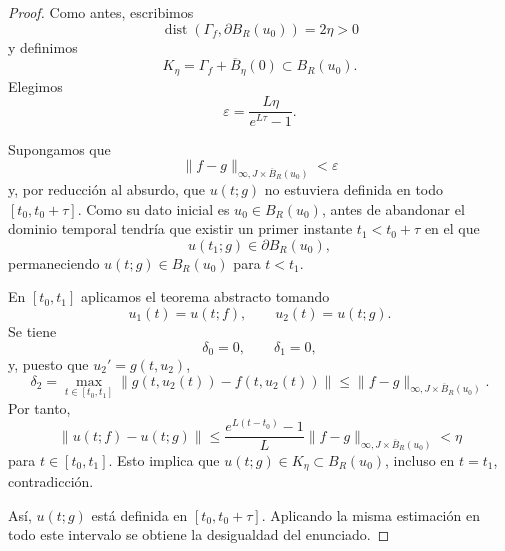 \begin{proof}
    Como antes, escribimos
    \[
        \operatorname{dist}(\Gamma_f,\partial B_R(u_0))=2\eta>0
    \]
    y definimos
    \[
        K_\eta=\Gamma_f+\overline{B}_\eta(0)\subset B_R(u_0).
    \]
    Elegimos
    \[
        \varepsilon=\frac{L\eta}{e^{L\tau}-1}.
    \]

    \begin{center}
    \end{center}

    Supongamos que
    \[
        \|f-g\|_{\infty,J\times\overline{B}_R(u_0)}<\varepsilon
    \]
    y, por reducción al absurdo, que $u(t;g)$ no estuviera definida en todo $[t_0,t_0+\tau]$. Como su dato inicial es $u_0\in B_R(u_0)$, antes de abandonar el dominio temporal tendría que existir un primer instante $t_1<t_0+\tau$ en el que
    \[
        u(t_1;g)\in\partial B_R(u_0),
    \]
    permaneciendo $u(t;g)\in B_R(u_0)$ para $t<t_1$.

    En $[t_0,t_1]$ aplicamos el teorema abstracto tomando
    \[
        u_1(t)=u(t;f),\qquad u_2(t)=u(t;g).
    \]
    Se tiene
    \[
        \delta_0=0,\qquad \delta_1=0,
    \]
    y, puesto que $u_2'=g(t,u_2)$,
    \[
        \delta_2
        =\max_{t\in[t_0,t_1]}
        \|g(t,u_2(t))-f(t,u_2(t))\|
        \leq\|f-g\|_{\infty,J\times\overline{B}_R(u_0)}.
    \]
    Por tanto,
    \[
        \|u(t;f)-u(t;g)\|
        \leq
        \frac{e^{L(t-t_0)}-1}{L}
        \|f-g\|_{\infty,J\times\overline{B}_R(u_0)}
        <\eta
    \]
    para $t\in[t_0,t_1]$. Esto implica que $u(t;g)\in K_\eta\subset B_R(u_0)$, incluso en $t=t_1$, contradicción.

    Así, $u(t;g)$ está definida en $[t_0,t_0+\tau]$. Aplicando la misma estimación en todo este intervalo se obtiene la desigualdad del enunciado.
\end{proof}

